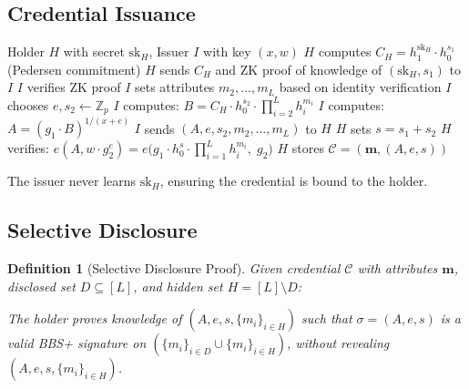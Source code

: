 \documentclass[11pt,a4paper]{article}
\newtheorem{definition}{Definition}[section]
\begin{document}
\subsection{Credential Issuance}

\begin{algorithm}[H]
\caption{Credential Issuance Protocol}
\label{alg:issuance}
\begin{algorithmic}[1]
\Require Holder $H$ with secret $\mathrm{sk}_H$, Issuer $I$ with key
    $(x, w)$
\State {}
\State $H$ computes $C_H = h_1^{\mathrm{sk}_H} \cdot h_0^{s_1}$
    (Pedersen commitment)
\State $H$ sends $C_H$ and ZK proof of knowledge of
    $(\mathrm{sk}_H, s_1)$ to $I$
\State
\State {}
\State $I$ verifies ZK proof
\State $I$ sets attributes $m_2, \ldots, m_L$ based on identity
    verification
\State $I$ chooses $e, s_2 \leftarrow \mathbb{Z}_p$
\State $I$ computes:
    $B = C_H \cdot h_0^{s_2} \cdot \prod_{i=2}^{L} h_i^{m_i}$
\State $I$ computes: $A = (g_1 \cdot B)^{1/(x+e)}$
\State $I$ sends $(A, e, s_2, m_2, \ldots, m_L)$ to $H$
\State
\State {}
\State $H$ sets $s = s_1 + s_2$
\State $H$ verifies: $e(A, w \cdot g_2^e) =
    e\bigl(g_1 \cdot h_0^s \cdot \prod_{i=1}^{L} h_i^{m_i},\;
    g_2\bigr)$
\State $H$ stores $\mathcal{C} = (\mathbf{m}, (A, e, s))$
\end{algorithmic}
\end{algorithm}

The issuer never learns $\mathrm{sk}_H$, ensuring the credential is
bound to the holder.

\subsection{Selective Disclosure}

\begin{definition}[Selective Disclosure Proof]
    Given credential $\mathcal{C}$ with attributes $\mathbf{m}$,
    disclosed set $D \subseteq [L]$, and hidden set $H = [L] \setminus D$:

    The holder proves knowledge of $(A, e, s, \{m_i\}_{i \in H})$ such
    that $\sigma = (A, e, s)$ is a valid BBS+ signature on
    $(\{m_i\}_{i \in D} \cup \{m_i\}_{i \in H})$, without revealing
    $(A, e, s, \{m_i\}_{i \in H})$.
\end{definition}
\end{document}
